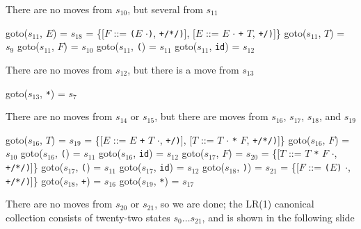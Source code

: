 \documentclass[8pt,a4paper,compress,handout]{beamer}
\newcommand{\mm}[1]{$#1$}
\newcommand{\subs}[2]{${#1}_{#2}$}
\newenvironment{spaced}
{
\smallskip
\hspace{.5cm}
\begin{minipage}[c]{\textwidth}
}
{
\end{minipage}
\smallskip
}
\begin{document}
\begin{frame}[fragile]
\pause

There are no moves from $s_{10}$, but several from $s_{11}$

\text{ }
\begin{spaced}
\begin{production}
goto(\subs{s}{11}, \mm{E}) = \subs{s}{18}
                 = \{[\mm{F}  ::= \lstinline{(}\mm{E} \mm{\cdot}\lstinline{)}, \lstinline{+/*/)}],
                     [\mm{E}  ::= \mm{E} \mm{\cdot} \lstinline{+} \mm{T}, \lstinline{+/)}]\}
goto(\subs{s}{11}, \mm{T}) = \subs{s}{9}
goto(\subs{s}{11}, \mm{F}) = \subs{s}{10}
goto(\subs{s}{11}, \lstinline{(}) = \subs{s}{11}
goto(\subs{s}{11}, \lstinline{id}) = \subs{s}{12}
\end{production}
\end{spaced}

\pause

There are no moves from $s_{12}$, but there is a move from $s_{13}$

\text{ }
\begin{spaced}
\begin{production}
goto(\subs{s}{13}, \lstinline{*}) = \subs{s}{7}
\end{production}
\end{spaced}

\pause

There are no moves from $s_{14}$ or $s_{15}$, but there are moves from $s_{16}$, $s_{17}$, $s_{18}$, and $s_{19}$
\end{frame}

\begin{frame}[fragile]
\pause

\text{ }
\begin{spaced}
\begin{production}
goto(\subs{s}{16}, \mm{T}) = \subs{s}{19}
 		= \{[\mm{E}  ::= \mm{E} \lstinline{+} \mm{T} \mm{\cdot}, \lstinline{+/)}],
                     [\mm{T}  ::= \mm{T} \mm{\cdot} \lstinline{*} \mm{F}, \lstinline{+/*/)}]\}
goto(\subs{s}{16}, \mm{F}) = \subs{s}{10}
goto(\subs{s}{16}, \lstinline{(}) = \subs{s}{11}
goto(\subs{s}{16}, \lstinline{id}) = \subs{s}{12}
goto(\subs{s}{17}, \mm{F}) = \subs{s}{20}
                = \{[\mm{T}  ::= \mm{T} \lstinline{*} \mm{F} \mm{\cdot}, \lstinline{+/*/)}]\}
goto(\subs{s}{17}, \lstinline{(}) = \subs{s}{11}
goto(\subs{s}{17}, \lstinline{id}) = \subs{s}{12}
goto(\subs{s}{18}, \lstinline{)}) = \subs{s}{21}
		= \{[\mm{F}  ::= \lstinline{(}\mm{E}\lstinline{)} \mm{\cdot}, \lstinline{+/*/)}]\}
goto(\subs{s}{18}, \lstinline{+}) = \subs{s}{16}
goto(\subs{s}{19}, \lstinline{*}) = \subs{s}{17}
\end{production}
\end{spaced}

\pause

There are no moves from $s_{20}$ or $s_{21}$, so we are done; the LR(1) canonical collection consists of twenty-two states $s_0 \dots s_{21}$, and is shown in the following slide
\end{frame}
\end{document}
